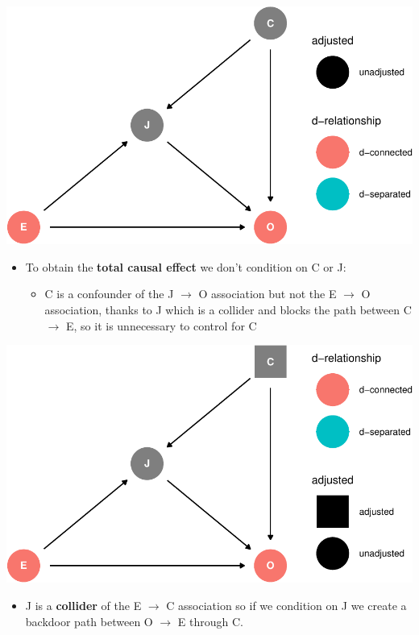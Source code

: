 \documentclass[
]{article}
\providecommand{\tightlist}{%
  \setlength{\itemsep}{0pt}\setlength{\parskip}{0pt}}
\begin{document}
\includegraphics{index_files/figure-latex/dag1.4 ex1-1.pdf}

\begin{itemize}
\item
  To obtain the \textbf{total causal effect} we don't condition on C or
  J:

  \begin{itemize}
  \tightlist
  \item
    C is a confounder of the J \(\to\) O association but not the E
    \(\to\) O association, thanks to J which is a collider and blocks
    the path between C \(\to\) E, so it is unnecessary to control for C
  \end{itemize}
\end{itemize}

\includegraphics{index_files/figure-latex/adjust C ex-1.pdf}

\begin{itemize}
\tightlist
\item
  J is a \textbf{collider} of the E \(\to\) C association so if we
  condition on J we create a backdoor path between O \(\to\) E through
  C.
\end{itemize}
\end{document}
